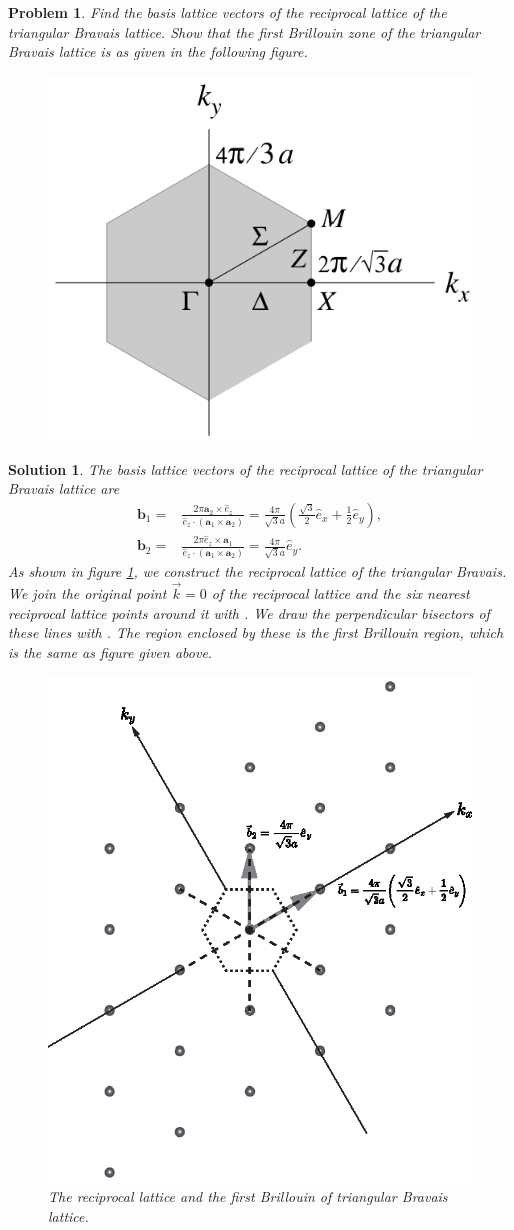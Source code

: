 \documentclass[UTF8,10pt,a4paper]{article}
\theoremstyle{Problem}
\newtheorem{prob}{Problem}
\theoremstyle{Solution}
\newtheorem*{sol}{Solution}
\begin{document}
\begin{prob}
    Find the basis lattice vectors of the reciprocal lattice of the triangular Bravais lattice. Show that the first Brillouin zone of the triangular Bravais lattice is as given in the following figure.
    \begin{figure}[h]
        \centering
        \includegraphics[width=.2\textwidth]{FirstBrillouinZone.png}
    \end{figure}
\end{prob}
\begin{sol}
    The basis lattice vectors of the reciprocal lattice of the triangular Bravais lattice are
    \begin{align}
        \bm{b}_1=&\frac{2\pi\bm{a}_2\times\hat{e}_z}{\hat{e}_z\cdot(\bm{a}_1\times\bm{a}_2)}=\frac{4\pi}{\sqrt{3}a}(\frac{\sqrt{3}}{2}\hat{e}_x+\frac{1}{2}\hat{e}_y),\\
        \bm{b}_2=&\frac{2\pi\hat{e}_z\times\bm{a}_1}{\hat{e}_z\cdot(\bm{a}_1\times\bm{a}_2)}=\frac{4\pi}{\sqrt{3}a}\hat{e}_y.
    \end{align}
    As shown in figure \ref{3-RLFB}, we construct the reciprocal lattice of the triangular Bravais. We join the original point $\vec{k}=0$ of the reciprocal lattice and the six nearest reciprocal lattice points around it with . We draw the perpendicular bisectors of these lines with . The region enclosed by these  is the first Brillouin region, which is the same as figure given above.
    \newpage
    \begin{figure}[h]
        \centering
        \includegraphics[width=.4\textwidth]{3.eps}
        \caption{The reciprocal lattice and the first Brillouin of triangular Bravais lattice.}
        \label{3-RLFB}
    \end{figure}
\end{sol}
\end{document}
